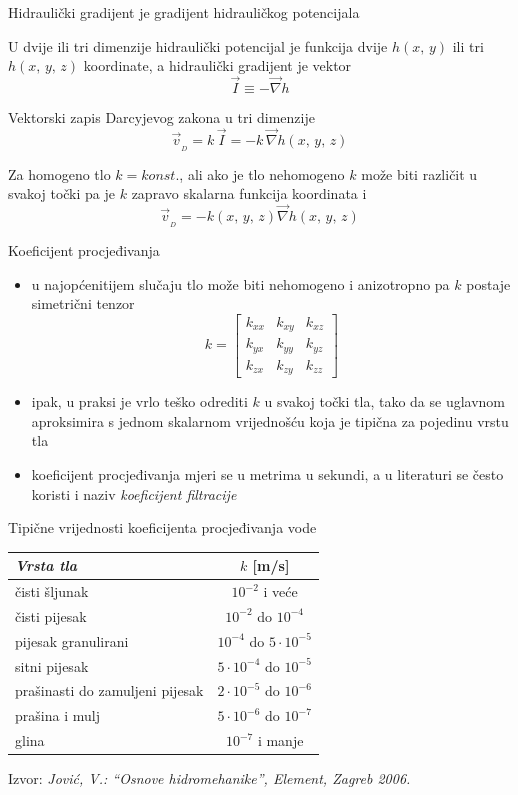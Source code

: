 \documentclass[croatian]{beamer}
\begin{document}
%
\begin{frame}{Hidraulički gradijent je gradijent hidrauličkog potencijala}
\begin{block}{}
U dvije ili tri dimenzije hidraulički potencijal je funkcija dvije
$h(x,\,y)$ ili tri $h(x,\,y,\,z)$ koordinate, a hidraulički gradijent
je vektor 
\[
\vec{I}\equiv-\vec{\nabla}h
\]
\end{block}
\begin{alertblock}{Vektorski zapis Darcyjevog zakona u tri dimenzije}
\[
\vec{v}_{_{D}}=k\,\vec{I}=-k\,\vec{\nabla}h(x,\,y,\,z)
\]
\end{alertblock}
Za homogeno tlo $k=konst.$, ali ako je tlo nehomogeno $k$ može biti
različit u svakoj točki pa je $k$ zapravo skalarna funkcija koordinata
i 
\[
\vec{v}_{_{D}}=-k(x,\,y,\,z)\vec{\nabla}h(x,\,y,\,z)
\]
\end{frame}
%
\begin{frame}{Koeficijent procjeđivanja}
\begin{itemize}
\item u najopćenitijem slučaju tlo može biti nehomogeno i anizotropno pa
$k$ postaje simetrični tenzor 
\[
k=\left[\begin{array}{ccc}
k_{xx} & k_{xy} & k_{xz}\\
k_{yx} & k_{yy} & k_{yz}\\
k_{zx} & k_{zy} & k_{zz}
\end{array}\right]
\]
\item ipak, u praksi je vrlo teško odrediti $k$ u svakoj točki tla, tako
da se uglavnom aproksimira s jednom skalarnom vrijednošću koja je
tipična za pojedinu vrstu tla 
\item koeficijent procjeđivanja mjeri se u metrima u sekundi, a u literaturi
se često koristi i naziv \emph{koeficijent filtracije} 
\end{itemize}
\end{frame}
%
\begin{frame}{Tipične vrijednosti koeficijenta procjeđivanja vode}
\begin{center}
\begin{tabular}{|l|c|}
\hline 
\emph{Vrsta tla}  & $k$ {[}m/s{]}\tabularnewline
\hline 
\hline 
čisti šljunak  & $10^{-2}$ i veće\tabularnewline
\hline 
čisti pijesak  & $10^{-2}$ do $10^{-4}$\tabularnewline
\hline 
pijesak granulirani  & $10^{-4}$ do $5\cdot10^{-5}$\tabularnewline
\hline 
sitni pijesak  & $5\cdot10^{-4}$ do $10^{-5}$\tabularnewline
\hline 
prašinasti do zamuljeni pijesak  & $2\cdot10^{-5}$ do $10^{-6}$\tabularnewline
\hline 
prašina i mulj  & $5\cdot10^{-6}$ do $10^{-7}$\tabularnewline
\hline 
glina  & $10^{-7}$ i manje \tabularnewline
\hline 
\end{tabular}
\par\end{center}
\vfill{}
 Izvor: \emph{Jović, V.: ``Osnove hidromehanike'', Element, Zagreb
2006.} 
\end{frame}
\end{document}

